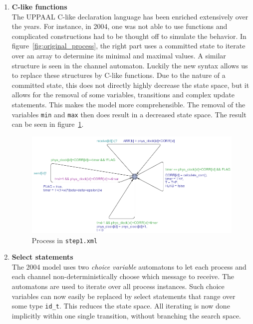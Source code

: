 \documentclass[a4paper,10pt]{article}
\newcommand{\UPPAAL}{UPPAAL\xspace}
\begin{document}
\begin{enumerate}
\item \textbf{C-like functions} \\
	The \UPPAAL C-like declaration language has been enriched extensively over the years. For instance, in 2004, one was not able to use functions and complicated constructions had to be thought off to simulate the behavior. In figure~\ref{fig:original_process}, the right part uses a committed state to iterate over an array to determine its minimal and maximal values. A similar structure is seen in the channel automaton. Luckily the new syntax allows us to replace these structures by C-like functions. Due to the nature of a committed state, this does not directly highly decrease the state space, but it allows for the removal of some variables, transitions and complex update statements. This makes the model more comprehensible. The removal of the variables \texttt{min} and \texttt{max} then does result in a decreased state space. The result can be seen in figure~\ref{fig:step1_process}.

\begin{figure}[!h]
\includegraphics[width=\textwidth]{step1_process}
\caption{Process in \texttt{step1.xml}\label{fig:step1_process}}
\end{figure}

\item \textbf{Select statements} \\
	The 2004 model uses two \textit{choice variable} automatons to let each process and each channel non-deterministically choose which message to receive. The automatons are used to iterate over all process instances. Such choice variables can now easily be replaced by select statements that range over some type \texttt{id\_t}. This reduces the state space. All iterating is now done implicitly within one single transition, without branching the search space.


\end{enumerate}
\end{document}
